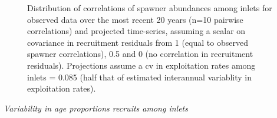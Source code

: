 \documentclass[11pt]{book}
\begin{document}
\begin{figure}[htb]

{\centering {} 

}

\caption{Distribution of correlations of spawner abundances among inlets for observed data over the most recent 20 years (n=10 pairwise correlations) and projected time-series, assuming a scalar on covariance in recruitment residuals from 1 (equal to observed spawner correlations), 0.5 and 0 (no correlation in recruitment residuals). Projections assume a cv in exploitation rates among inlets = 0.085 (half that of estimated interannual variablity in exploitation rates).}\label{fig:chinook-boxplotsRecCorSca}
\end{figure}
\newline

\emph{Variability in age proportions recruits among inlets}
\end{document}
